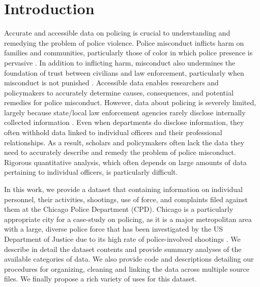 

\section{Introduction} \label{sec:intro}
Accurate and accessible data on policing is crucial to understanding and
remedying the problem of police violence. Police misconduct inflicts harm on
families and communities, particularly those of color in which police presence
is pervasive \cite{Alang17}. In addition to inflicting harm, misconduct also
undermines the foundation of trust between civilians and law enforcement,
particularly when misconduct is not punished \cite{Desmond16}. Accessible data
enables researchers and policymakers to accurately determine causes,
consequences, and potential remedies for police misconduct.
However, data about policing is severely limited, largely because state/local law
enforcement agencies rarely disclose internally collected information
\cite{Jackman21}. Even when departments do disclose information, they often
withhold data linked to individual officers and their professional
relationships.  As a result, scholars and policymakers often
lack the data they need to accurately describe and remedy the problem of police
misconduct.  Rigorous quantitative analysis, which often depends on large
amounts of data pertaining to individual officers, is particularly difficult.

In this work, we provide a dataset that containing information on individual
personnel, their activities, shootings, use of force, and complaints filed against them at
the Chicago Police Department (CPD). Chicago is a particularly appropriate
city for a case-study on policing, as it is a major metropolitan area with a
large, diverse police force that has been investigated by the US Department of
Justice due to its high rate of police-involved shootings \cite{DoJ17}.  We
describe in detail the dataset contents and provide summary analyses of the
available categories of data. We also provide code and descriptions detailing
our procedures for organizing, cleaning and linking the data across multiple
source files. We finally propose a rich variety of uses for this dataset.

